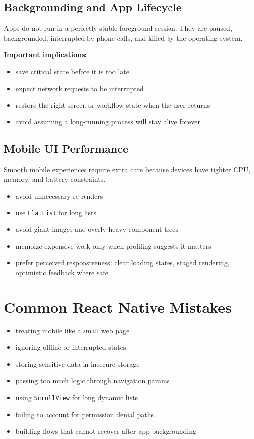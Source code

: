 \documentclass[12pt, a4paper, oneside]{book}
\begin{document}
\subsection{Backgrounding and App Lifecycle}
Apps do not run in a perfectly stable foreground session. They are paused, backgrounded, interrupted by phone calls, and killed by the operating system.

\textbf{Important implications:}
\begin{itemize}[leftmargin=2em]
    \item save critical state before it is too late
    \item expect network requests to be interrupted
    \item restore the right screen or workflow state when the user returns
    \item avoid assuming a long-running process will stay alive forever
\end{itemize}

\subsection{Mobile UI Performance}
Smooth mobile experiences require extra care because devices have tighter CPU, memory, and battery constraints.

\begin{itemize}[leftmargin=2em]
    \item avoid unnecessary re-renders
    \item use \texttt{FlatList} for long lists
    \item avoid giant images and overly heavy component trees
    \item memoize expensive work only when profiling suggests it matters
    \item prefer perceived responsiveness: clear loading states, staged rendering, optimistic feedback where safe
\end{itemize}

\section{Common React Native Mistakes}

\begin{itemize}[leftmargin=2em]
    \item treating mobile like a small web page
    \item ignoring offline or interrupted states
    \item storing sensitive data in insecure storage
    \item passing too much logic through navigation params
    \item using \texttt{ScrollView} for long dynamic lists
    \item failing to account for permission denial paths
    \item building flows that cannot recover after app backgrounding
\end{itemize}
\end{document}

